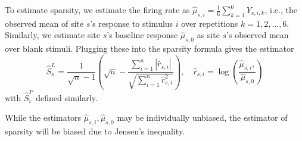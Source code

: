 \documentclass[draft]{cmustatproposal} %
\newcommand{\todo}[1]{{\color{purple}#1}}
\newenvironment{todoblock}{\color{purple}}{}
\begin{document}
\begin{todoblock}
To estimate sparsity, we estimate the firing rate as \( \widehat\mu_{s, i} = \frac{1}{6} \sum_{k = 1}^{6} Y_{s, i, k} \), i.e., the observed mean of site \( s \)'s response to stimulus \( i \) over repetitions \( k = 1, 2, \dots, 6 \). Similarly, we estimate site \( s \)'s baseline response \( \widehat{\mu}_{s, 0} \) as site \( s \)'s observed mean over blank stimuli. Plugging these into the sparsity formula gives the estimator
\begin{equation}
\label{eqn:sparsity_estimate}
\hat{S}_{s}^{L} = \frac{1}{\sqrt{n} - 1} \left( \sqrt{n} - \frac{\sum_{i = 1}^n |\hat{r}_{s, i}|}{\sqrt{\sum_{i = 1}^n \hat{r}_{s, i}^2}} \right), \quad 
\hat{r}_{s, i} = \log \left( \frac{\widehat\mu_{s, i},}{ \widehat{\mu}_{s, 0}} \right)
\end{equation}
with \( \hat{S}_{i}^P \) defined similarly.

While the estimators \( \widehat\mu_{s, i}, \widehat{\mu}_{s, 0} \) may be individually unbiased, the estimator of sparsity will be biased due to Jensen's inequality. 
\end{todoblock}
\end{document}
